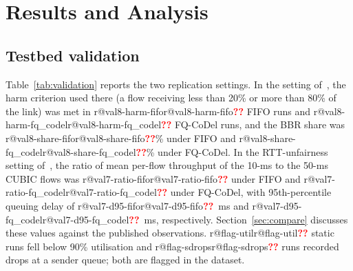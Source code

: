 \documentclass[conference]{IEEEtran}
\makeatletter
\newcommand{\R}[1]{\ifcsname r@#1\endcsname\csname r@#1\endcsname\else\textcolor{red}{\textbf{??}}\fi}
\makeatother
\begin{document}
\begin{table}[t]
\centering
\caption{Testbed parameters (hyperparameters).}
\label{tab:params}
\footnotesize
{}
\end{table}

\section{Results and Analysis}
\label{sec:results}

\subsection{Testbed validation}
Table~\ref{tab:validation} reports the two replication settings. In the setting of~\cite{sarpkaya2025l4s}, the harm criterion used there (a flow receiving less than 20\% or more than 80\% of the link) was met in \R{val8-harm-fifo} FIFO runs and \R{val8-harm-fq_codel} FQ-CoDel runs, and the BBR share was \R{val8-share-fifo}\% under FIFO and \R{val8-share-fq_codel}\% under FQ-CoDel. In the RTT-unfairness setting of~\cite{kumari2025cubic}, the ratio of mean per-flow throughput of the 10-ms to the 50-ms CUBIC flows was \R{val7-ratio-fifo} under FIFO and \R{val7-ratio-fq_codel} under FQ-CoDel, with 95th-percentile queuing delay of \R{val7-d95-fifo}~ms and \R{val7-d95-fq_codel}~ms, respectively. Section~\ref{sec:compare} discusses these values against the published observations. \R{flag-util} static runs fell below 90\% utilisation and \R{flag-sdrops} runs recorded drops at a sender queue; both are flagged in the dataset.
\end{document}
